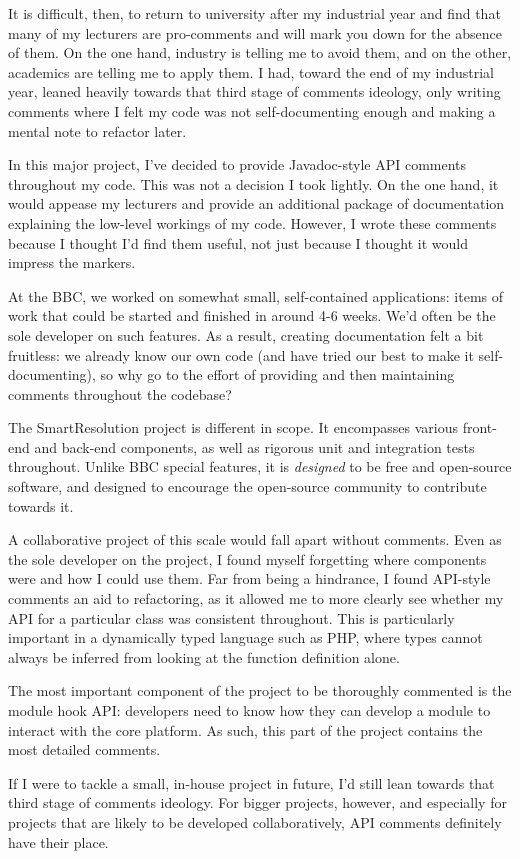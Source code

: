 It is difficult, then, to return to university after my industrial year and find that many of my lecturers are pro-comments and will mark you down for the absence of them. On the one hand, industry is telling me to avoid them, and on the other, academics are telling me to apply them. I had, toward the end of my industrial year, leaned heavily towards that third stage of comments ideology, only writing comments where I felt my code was not self-documenting enough and making a mental note to refactor later.

In this major project, I've decided to provide Javadoc-style API comments throughout my code. This was not a decision I took lightly. On the one hand, it would appease my lecturers and provide an additional package of documentation explaining the low-level workings of my code. However, I wrote these comments because I thought I'd find them useful, not just because I thought it would impress the markers.

At the BBC, we worked on somewhat small, self-contained applications: items of work that could be started and finished in around 4-6 weeks. We'd often be the sole developer on such features. As a result, creating documentation felt a bit fruitless: we already know our own code (and have tried our best to make it self-documenting), so why go to the effort of providing and then maintaining comments throughout the codebase?

The SmartResolution project is different in scope. It encompasses various front-end and back-end components, as well as rigorous unit and integration tests throughout. Unlike BBC special features, it is \emph{designed} to be free and open-source software, and designed to encourage the open-source community to contribute towards it.

A collaborative project of this scale would fall apart without comments. Even as the sole developer on the project, I found myself forgetting where components were and how I could use them. Far from being a hindrance, I found API-style comments an aid to refactoring, as it allowed me to more clearly see whether my API for a particular class was consistent throughout. This is particularly important in a dynamically typed language such as PHP, where types cannot always be inferred from looking at the function definition alone.

The most important component of the project to be thoroughly commented is the module hook API: developers need to know how they can develop a module to interact with the core platform. As such, this part of the project contains the most detailed comments.

If I were to tackle a small, in-house project in future, I'd still lean towards that third stage of comments ideology. For bigger projects, however, and especially for projects that are likely to be developed collaboratively, API comments definitely have their place.